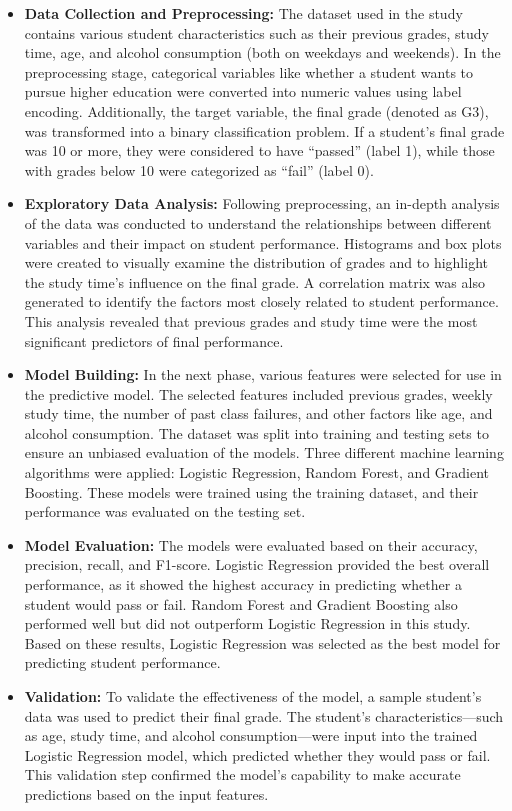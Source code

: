 \documentclass[preprint, 3p,
authoryear]{elsarticle} %
\begin{document}
\begin{itemize}
\item
  \textbf{Data Collection and Preprocessing:} The dataset used in the
  study contains various student characteristics such as their previous
  grades, study time, age, and alcohol consumption (both on weekdays and
  weekends). In the preprocessing stage, categorical variables like
  whether a student wants to pursue higher education were converted into
  numeric values using label encoding. Additionally, the target
  variable, the final grade (denoted as G3), was transformed into a
  binary classification problem. If a student's final grade was 10 or
  more, they were considered to have ``passed'' (label 1), while those
  with grades below 10 were categorized as ``fail'' (label 0).
\item
  \textbf{Exploratory Data Analysis:} Following preprocessing, an
  in-depth analysis of the data was conducted to understand the
  relationships between different variables and their impact on student
  performance. Histograms and box plots were created to visually examine
  the distribution of grades and to highlight the study time's influence
  on the final grade. A correlation matrix was also generated to
  identify the factors most closely related to student performance. This
  analysis revealed that previous grades and study time were the most
  significant predictors of final performance.
\item
  \textbf{Model Building:} In the next phase, various features were
  selected for use in the predictive model. The selected features
  included previous grades, weekly study time, the number of past class
  failures, and other factors like age, and alcohol consumption. The
  dataset was split into training and testing sets to ensure an unbiased
  evaluation of the models. Three different machine learning algorithms
  were applied: Logistic Regression, Random Forest, and Gradient
  Boosting. These models were trained using the training dataset, and
  their performance was evaluated on the testing set.
\item
  \textbf{Model Evaluation:} The models were evaluated based on their
  accuracy, precision, recall, and F1-score. Logistic Regression
  provided the best overall performance, as it showed the highest
  accuracy in predicting whether a student would pass or fail. Random
  Forest and Gradient Boosting also performed well but did not
  outperform Logistic Regression in this study. Based on these results,
  Logistic Regression was selected as the best model for predicting
  student performance.
\item
  \textbf{Validation:} To validate the effectiveness of the model, a
  sample student's data was used to predict their final grade. The
  student's characteristics---such as age, study time, and alcohol
  consumption---were input into the trained Logistic Regression model,
  which predicted whether they would pass or fail. This validation step
  confirmed the model's capability to make accurate predictions based on
  the input features.
\end{itemize}
\end{document}
